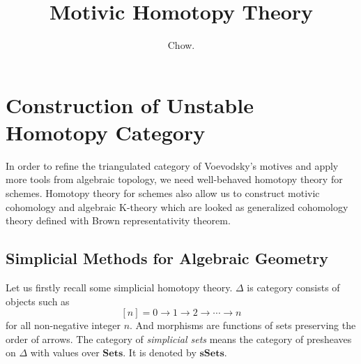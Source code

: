 \documentclass[b5paper,11pt]{article}
\title{Motivic Homotopy Theory}
\author{Chow.}
\begin{document}
\maketitle
\tableofcontents
	\section{Construction of Unstable Homotopy Category}
	In order to refine the triangulated category of Voevodsky's motives and apply more tools from algebraic topology, we need well-behaved homotopy theory for schemes. Homotopy theory for schemes also allow us to construct motivic cohomology and algebraic K-theory which are looked as generalized cohomology theory defined with Brown representativity theorem.
	\subsection{Simplicial Methods for Algebraic Geometry}
	Let us firstly recall some simplicial homotopy theory.
	$\Delta$ is category consists of objects such as
	\[
	[n]={0 \to 1 \to 2 \to \cdots \to n}
	\]
	for all non-negative integer $n$. And morphisms are functions of sets preserving the order of arrows.
	The category of \emph{simplicial sets} means the category of presheaves on $\Delta$ with values over $\mathbf{Sets}$. It is denoted by $\mathbf{sSets}$.
	
\end{document}
